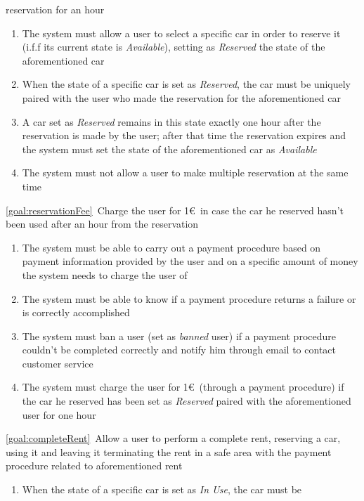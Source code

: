 \begin{description}
 	  	reservation for an hour
 	  		\begin{enumerate}[resume*]
 	  			\item The system must allow a user to select a specific car in order to reserve it 
 	  			(i.f.f its current state is \emph{Available}), setting as \emph{Reserved} the state of
 	  			the aforementioned car
 	  			\item When the state of a specific car is set as \emph{Reserved}, the car must be
 	  			uniquely paired with the user who made the reservation for the aforementioned car
 	  			\item A car set as \emph{Reserved} remains in this state exactly one hour after the
 	  			reservation is made by the user; after that time the reservation expires and the system
 	  			must set the state of the aforementioned car as \emph{Available}
 	  			\item The system must not allow a user to make multiple reservation at the same time
   			\end{enumerate}
  		\item \ref{goal:reservationFee}\ Charge the user for 1\euro\ in case the car he reserved hasn't
  		been used after an hour from the reservation
  			\begin{enumerate}[resume*]
  				\item The system must be able to carry out a payment procedure based on payment
  				information provided by the user and on a specific amount of money the system needs
  				to charge the user of
  				\item The system must be able to know if a payment procedure returns a failure or is
  				correctly accomplished
  				\item The system must ban a user (set as \emph{banned} user) if a
  				payment procedure couldn't be completed correctly and notify him through email to
  				contact customer service
  				\item The system must charge the user for 1\euro\ (through a payment procedure) if
  				the car he reserved has been set as \emph{Reserved} paired with the aforementioned
  				user for one hour
   			\end{enumerate}
  		\item \ref{goal:completeRent}\ Allow a user to perform a complete rent, reserving a car,
  		using it and leaving it terminating the rent in a safe area with the payment procedure
  		related to aforementioned rent
  			\begin{enumerate}[resume*]
  			 	\item When the state of a specific car is set as \emph{In Use}, the car must be

\end{enumerate}
\end{description}
